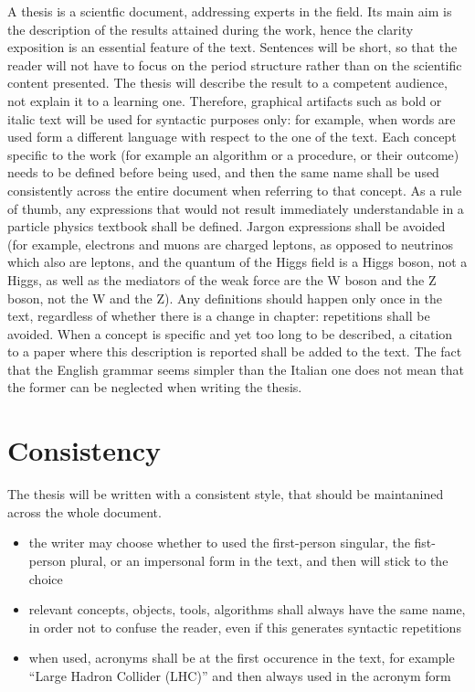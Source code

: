 A thesis is a scientfic document, addressing experts in the field.
Its main aim is the description of the results attained during the work,
hence the clarity exposition is an essential feature of the text.
Sentences will be short, so that the reader will not have to focus on the period structure
rather than on the scientific content presented.
The thesis will describe the result to a competent audience, 
not explain it to a learning one.
Therefore, graphical artifacts such as bold or italic text will be used
for syntactic purposes only: 
for example, when words are used form a different language with respect to the one of the text.
Each concept specific to the work 
(for example an algorithm or a procedure, or their outcome)
needs to be defined before being used, 
and then the same name shall be used consistently across the entire document
when referring to that concept.
As a rule of thumb, 
any expressions that would not result immediately understandable in a particle physics textbook
shall be defined.
Jargon expressions shall be avoided 
(for example, electrons and muons are charged leptons, as opposed to neutrinos which also are leptons,
and the quantum of the Higgs field is a Higgs boson, not a Higgs,
as well as the mediators of the weak force are the W boson and the Z boson, not the W and the Z).
Any definitions should happen only once in the text,
regardless of whether there is a change in chapter:
repetitions shall be avoided.
When a concept is specific and yet too long to be described, 
a citation to a paper where this description is reported shall be added to the text.
The fact that the English grammar seems simpler than the Italian one
does not mean that the former can be neglected when writing the thesis.


\section{Consistency}

The thesis will be written with a consistent style,
that should be maintanined across the whole document.
\begin{itemize}
\item the writer may choose whether to used the first-person singular, 
      the fist-person plural, or an impersonal form in the text, 
      and then will stick to the choice
\item relevant concepts, objects, tools, algorithms shall always have the same name,
      in order not to confuse the reader, even if this generates syntactic repetitions
\item when used, acronyms shall be at the first occurence in the text, for example
      ``Large Hadron Collider (LHC)'' and then always used in the acronym form
\end{itemize}	


